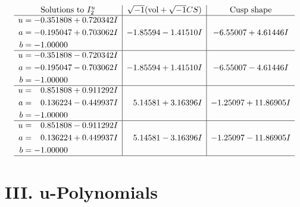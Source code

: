 \documentclass[1p]{elsarticle_modified}
\theoremstyle{definition}
\newcommand{\I}{\sqrt{-1}}
\begin{document}
$$\begin{array}{c|c|c}  
\text{Solutions to }I^u_{2}& \I (\text{vol} + \sqrt{-1}CS) & \text{Cusp shape}\\
 \hline 
\begin{aligned}
u &= -0.351808 + 0.720342 I \\
a &= -0.195047 + 0.703062 I \\
b &= -1.00000\phantom{ +0.000000I}\end{aligned}
 & -1.85594 - 1.41510 I & -6.55007 + 4.61446 I \\ \hline\begin{aligned}
u &= -0.351808 - 0.720342 I \\
a &= -0.195047 - 0.703062 I \\
b &= -1.00000\phantom{ +0.000000I}\end{aligned}
 & -1.85594 + 1.41510 I & -6.55007 - 4.61446 I \\ \hline\begin{aligned}
u &= \phantom{-}0.851808 + 0.911292 I \\
a &= \phantom{-}0.136224 - 0.449937 I \\
b &= -1.00000\phantom{ +0.000000I}\end{aligned}
 & \phantom{-}5.14581 + 3.16396 I & -1.25097 + 11.86905 I \\ \hline\begin{aligned}
u &= \phantom{-}0.851808 - 0.911292 I \\
a &= \phantom{-}0.136224 + 0.449937 I \\
b &= -1.00000\phantom{ +0.000000I}\end{aligned}
 & \phantom{-}5.14581 - 3.16396 I & -1.25097 - 11.86905 I\\
 \hline 
 \end{array}$$\newpage
\newpage\renewcommand{\arraystretch}{1}
\centering \section*{ III. u-Polynomials}
\end{document}
